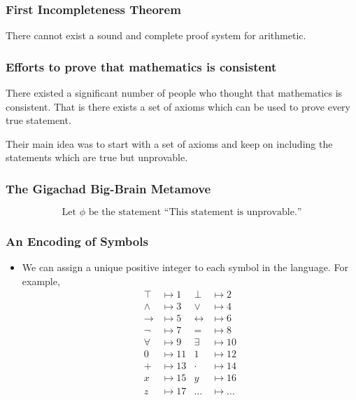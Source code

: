 \documentclass{beamer}
\DeclareMathOperator{\Th}{Th}
\begin{document}
%

\begin{frame}
\frametitle{First Incompleteness Theorem}
\begin{theorem}[1931]
    There cannot exist a sound and complete proof system for
    arithmetic.
\end{theorem}
\end{frame}
\begin{frame}
\frametitle{Efforts to prove that mathematics is consistent}
There existed a significant number of people who thought that mathematics is consistent.
That is there exists a set of axioms which can be used to prove every true statement.

Their main idea was to start with a set of axioms and keep on including the statements which are true but unprovable.
\end{frame}

\begin{frame}
\frametitle{The Gigachad Big-Brain Metamove}
\[
    \text{Let } \phi \text{ be the statement ``This statement is unprovable.''}
\]
\end{frame}

\begin{frame}
\frametitle{An Encoding of Symbols}
\begin{itemize}
    \item We can assign a unique positive integer to each symbol in the
    language.
    For example,
    \begin{align*}
        \top &\mapsto 1 & \bot &\mapsto 2 \\
        \land &\mapsto 3 & \lor &\mapsto 4 \\
        \to &\mapsto 5 & \leftrightarrow &\mapsto 6 \\
        \neg &\mapsto 7 & = &\mapsto 8 \\
        \forall &\mapsto 9 & \exists &\mapsto 10 \\
        0 &\mapsto 11 & 1 &\mapsto 12 \\
        + &\mapsto 13 & \cdot &\mapsto 14 \\
        x &\mapsto 15 & y &\mapsto 16 \\
        z &\mapsto 17 & \ldots &\mapsto \ldots
    \end{align*}
\end{itemize}
\end{frame}
\end{document}
